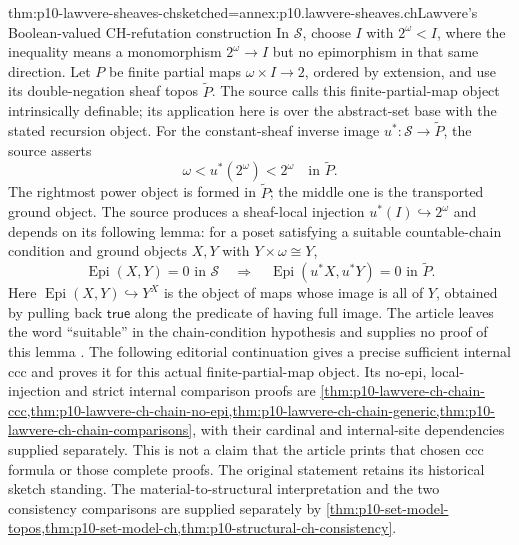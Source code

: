 \begin{hbtheorem}{thm:p10-lawvere-sheaves-ch}{sketched=annex:p10.lawvere-sheaves.ch}{Lawvere's Boolean-valued CH-refutation construction}
In \(\mathcal S\), choose \(I\) with \(2^\omega<I\), where
the inequality means a monomorphism \(2^\omega\to I\) but no
epimorphism in that same direction.  Let \(P\)
be finite partial maps \(\omega\times I\to2\), ordered by
extension, and use its double-negation sheaf topos
\(\widetilde P\).  The source calls this finite-partial-map
object intrinsically definable; its application here is over the
abstract-set base with the stated recursion object.  For the
constant-sheaf inverse image
\(u^*:\mathcal S\to\widetilde P\), the source asserts
\[
                    \omega<u^*(2^\omega)<2^\omega
                      \quad\text{in }\widetilde P.
\]
The rightmost power object is formed in \(\widetilde P\);
the middle one is the transported ground object.  The source
produces a sheaf-local injection \(u^*(I)\hookrightarrow2^\omega\)
and depends on its following lemma: for a poset satisfying a suitable
countable-chain condition and ground objects \(X,Y\) with
\(Y\times\omega\cong Y\),
\[
 \operatorname{Epi}(X,Y)=0\text{ in }\mathcal S
 \quad\Longrightarrow\quad
 \operatorname{Epi}(u^*X,u^*Y)=0\text{ in }\widetilde P.
\]
Here \(\operatorname{Epi}(X,Y)\hookrightarrow Y^X\) is the
object of maps whose image is all of \(Y\), obtained by pulling
back \(\mathsf{true}\) along the predicate of having full image.
The article leaves the word ``suitable'' in the chain-condition
hypothesis and supplies no proof of this lemma
\cite[p.~333]{Lawvere1970}. The following editorial continuation
gives a precise sufficient internal ccc and proves it for this actual
finite-partial-map object. Its no-epi, local-injection and strict
internal comparison proofs are
\cref{thm:p10-lawvere-ch-chain-ccc,thm:p10-lawvere-ch-chain-no-epi,thm:p10-lawvere-ch-chain-generic,thm:p10-lawvere-ch-chain-comparisons},
with their cardinal and internal-site dependencies supplied separately.
This is not a claim that the article prints that chosen ccc formula
or those complete proofs. The original statement retains its historical
sketch standing. The material-to-structural interpretation and the two consistency
comparisons are supplied separately by
\cref{thm:p10-set-model-topos,thm:p10-set-model-ch,thm:p10-structural-ch-consistency}.
\end{hbtheorem}




